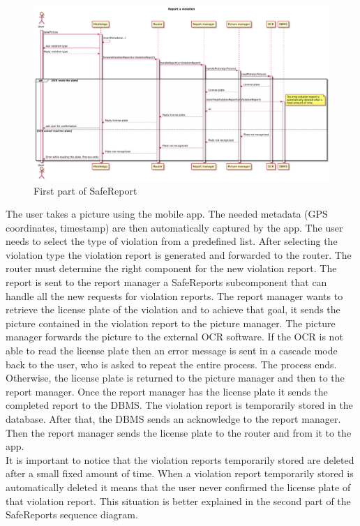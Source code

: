 \documentclass[./main.tex]{subfiles}
\begin{document}
\begin{figure}[H]
\centering
\includegraphics[width=\textwidth]{resources/sequence_diagrams/safeReports1}
\caption{First part of SafeReport}
\end{figure}

The user takes a picture using the mobile app. The needed metadata
(GPS coordinates, timestamp) are then automatically captured by the app.
The user needs to select the type of violation from a predefined list.
After selecting the violation type the violation report is generated and
forwarded to the router. The router must determine the right component for the new violation report. The report is sent to the report manager a SafeReports subcomponent that can handle all the new requests for violation reports.
The report manager wants to retrieve the license plate of the violation
and to achieve that goal, it sends the picture contained in the
violation report to the picture manager.
The picture manager forwards the picture to the external OCR software.
If the OCR is not able to read the license plate then an error message is
sent in a cascade mode back to the user, who is asked to repeat the entire process. The process ends.
\\Otherwise, the license plate is returned to the picture manager and then to the report manager.
Once the report manager has the license plate it sends the completed report to the DBMS. The violation report is temporarily stored in the database. After that, the DBMS sends an acknowledge to the report manager. Then the report manager sends the license plate to the router and from it to the app.
\\It is important to notice that the violation reports temporarily stored are deleted after a small fixed amount of time. When a violation report temporarily stored is automatically deleted it means that the user never confirmed the license plate of that violation report. This situation is better explained in the second part of the SafeReports sequence diagram.
\end{document}
